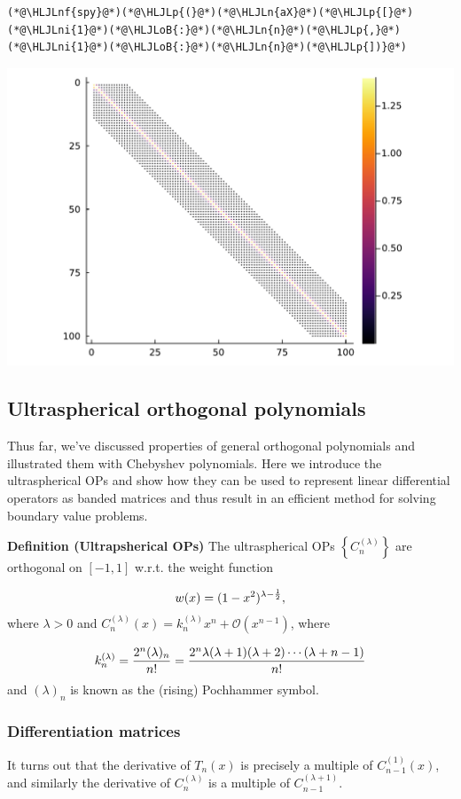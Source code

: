 \documentclass[12pt,a4paper]{article}
\newcommand{\HLJLn}[1]{#1}
\newcommand{\HLJLnf}[1]{\textcolor[RGB]{66,102,213}{#1}}
\newcommand{\HLJLni}[1]{\textcolor[RGB]{59,151,46}{#1}}
\newcommand{\HLJLoB}[1]{\textcolor[RGB]{102,102,102}{\textbf{#1}}}
\newcommand{\HLJLp}[1]{#1}
\begin{document}
\begin{lstlisting}
(*@\HLJLnf{spy}@*)(*@\HLJLp{(}@*)(*@\HLJLn{aX}@*)(*@\HLJLp{[}@*)(*@\HLJLni{1}@*)(*@\HLJLoB{:}@*)(*@\HLJLn{n}@*)(*@\HLJLp{,}@*)(*@\HLJLni{1}@*)(*@\HLJLoB{:}@*)(*@\HLJLn{n}@*)(*@\HLJLp{])}@*)
\end{lstlisting}

\includegraphics[width=\linewidth]{jl_GsbqQZ/Chapter4_7_1.pdf}

\subsection{Ultraspherical orthogonal polynomials}
Thus far, we've discussed properties of general orthogonal polynomials and illustrated them with Chebyshev polynomials.  Here we introduce the ultraspherical OPs and show how they can be used to represent linear differential operators as banded matrices and thus result in an efficient method for solving boundary value problems.

\textbf{Definition (Ultrapsherical OPs)} The ultraspherical OPs $\left\lbrace C_n^{(\lambda)} \right\rbrace$ are orthogonal on $[-1, 1]$ w.r.t. the weight function

\[
w(x) = (1-x^2)^{\lambda - {1\over 2}},
\]
where  $\lambda > 0$ and $C_n^{(\lambda)}(x) = k^{(\lambda)}_{n}x^n + \mathcal{O}(x^{n-1})$, where

\[
k_n^{(\lambda)} = {2^n (\lambda)_n \over n!} = {2^n \lambda (\lambda+1) (\lambda+2) \cdots (\lambda+n-1)  \over n!}
\]
and $(\lambda)_n$ is known as the (rising) Pochhammer symbol.

\subsubsection{Differentiation matrices}
It turns out that the derivative of $T_n(x)$ is precisely a multiple of  $C^{(1)}_{n-1}(x)$, and similarly the derivative of $C_n^{(\lambda)}$ is a multiple of $C_{n-1}^{(\lambda+1)}$.
\end{document}
